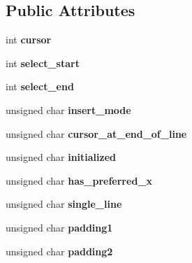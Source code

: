 \subsection*{Public Attributes}
\begin{DoxyCompactItemize}
\item 
\mbox{\label{structSTB__TexteditState_a7a1414f3286070306a5184f9473ccf9f}} 
int {\bfseries cursor}
\item 
\mbox{\label{structSTB__TexteditState_a74d595403e0b6f99cd0163ee87f4344d}} 
int {\bfseries select\+\_\+start}
\item 
\mbox{\label{structSTB__TexteditState_abf8b1b1064770e4579c5bb8c4a41d8f0}} 
int {\bfseries select\+\_\+end}
\item 
\mbox{\label{structSTB__TexteditState_af26029a4f1f76d043afd35072fabcb4b}} 
unsigned char {\bfseries insert\+\_\+mode}
\item 
\mbox{\label{structSTB__TexteditState_a0e7ba5f610f5dc2d643bef0f223ada9c}} 
unsigned char {\bfseries cursor\+\_\+at\+\_\+end\+\_\+of\+\_\+line}
\item 
\mbox{\label{structSTB__TexteditState_a11a63150e95225aacd204d6ef160c0c0}} 
unsigned char {\bfseries initialized}
\item 
\mbox{\label{structSTB__TexteditState_aaca2d581ed565f86288038816274e007}} 
unsigned char {\bfseries has\+\_\+preferred\+\_\+x}
\item 
\mbox{\label{structSTB__TexteditState_a63299aca2cb4e009dfa41cda5e651316}} 
unsigned char {\bfseries single\+\_\+line}
\item 
\mbox{\label{structSTB__TexteditState_a1e43e8ac88a8c7f2bba645b333a8bdc7}} 
unsigned char {\bfseries padding1}
\item 
\mbox{\label{structSTB__TexteditState_af5a708e49f23f79bb14c9b0f4ad03371}} 
unsigned char {\bfseries padding2}

\end{DoxyCompactItemize}

